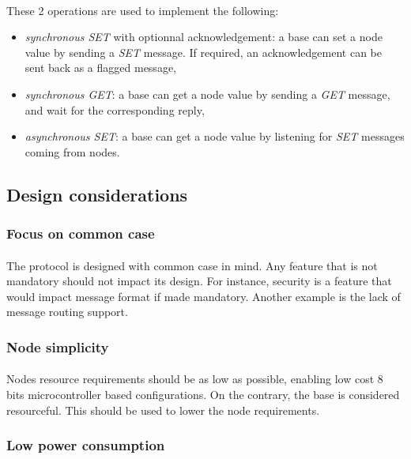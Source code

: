 \documentclass[a4paper, 11pt]{article}
\begin{document}
\paragraph{}
These 2 operations are used to implement the following:
\begin{itemize}
\item \textit{synchronous SET} with optionnal acknowledgement: a base can set a
node value by sending a \textit{SET} message. If required, an acknowledgement can
be sent back as a flagged message,
\item \textit{synchronous GET}: a base can get a node value by sending a
\textit{GET} message, and wait for the corresponding reply,
\item \textit{asynchronous SET}: a base can get a node value by listening for
\textit{SET} messages coming from nodes.
\end{itemize}


\subsection{Design considerations}

\subsubsection{Focus on common case}
\paragraph{}
The protocol is designed with common case in mind. Any feature that is not
mandatory should not impact its design. For instance, security is a feature
that would impact message format if made mandatory. Another example is the
lack of message routing support.

\subsubsection{Node simplicity}
\paragraph{}
Nodes resource requirements should be as low as possible, enabling low cost
8 bits microcontroller based configurations. On the contrary, the base is
considered resourceful. This should be used to lower the node requirements.

\subsubsection{Low power consumption}
\end{document}
